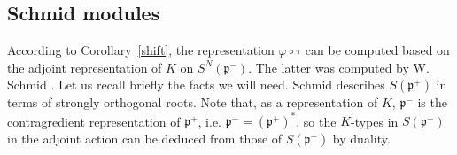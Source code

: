 \documentclass{amsart}[draft,11pt]
\newcommand{\fp}{{\mathfrak{p}}}
\numberwithin{equation}{section}
\theoremstyle{definition}
\begin{document}
\subsection{Schmid modules}
\label{section-schmid}
According to Corollary~\ref{shift}, the representation $\varphi \circ \tau$
can be computed based on the adjoint representation of $K$ on $S^N(\fp^-)$. The latter was computed by W. Schmid \cite{schmid}. Let us recall briefly the facts we will need.
 Schmid describes $S({\mathfrak p}^+)$ in terms of strongly orthogonal roots. Note that, as a representation of $K$, ${\mathfrak p}^-$ is the contragredient representation of ${\mathfrak p}^+$, i.e.
 ${\mathfrak p}^-=({\mathfrak p}^+)^*$,
 so the $K$-types in $S({\mathfrak p}^-)$ in the adjoint action can be deduced from those of $S({\mathfrak p}^+)$ by duality.
 
\end{document}
